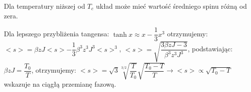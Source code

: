 Dla temperatury niższej od $ T_c $ układ może mieć wartość średniego spinu różną od zera.

Dla lepszego przybliżenia tangensa:\newline
$ \tanh x \approx x - \dfrac{1}{3} x^3 $\newline
otrzymujemy:\newline
$ <s> = \beta z J <s> - \dfrac{1}{3} \beta^3 z^3 J^3 <s>^3 $,\newline
$ <s> = \sqrt{\dfrac{3\beta z J - 3}{\beta^3 z^3 J^3}} $, podstawiając:\newline
$ \beta z J = \dfrac{T_0}{T} $, otrzymujemy:\newline
$ <s> = \sqrt{3}\sqrt[3/2]{\dfrac{T}{T_0}}\sqrt{\dfrac{T_0 - T}{T}} \rightarrow <s> \propto \sqrt{T_0 - T} $ wskazuje na ciągłą przemianę fazową.
